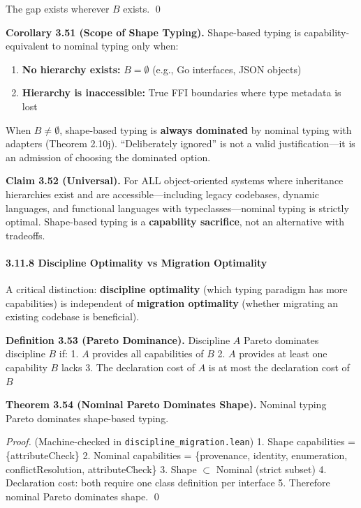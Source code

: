 The gap exists wherever \(B\) exists. \qed

\textbf{Corollary 3.51 (Scope of Shape Typing).} Shape-based typing is
capability-equivalent to nominal typing only when:

\begin{enumerate}
\def\labelenumi{\arabic{enumi}.}
\tightlist
\item
  \textbf{No hierarchy exists:} \(B = \emptyset\) (e.g., Go interfaces,
  JSON objects)
\item
  \textbf{Hierarchy is inaccessible:} True FFI boundaries where type
  metadata is lost
\end{enumerate}

When \(B \neq \emptyset\), shape-based typing is \textbf{always
dominated} by nominal typing with adapters (Theorem 2.10j).
``Deliberately ignored'' is not a valid justification---it is an
admission of choosing the dominated option.

\textbf{Claim 3.52 (Universal).} For ALL object-oriented systems where
inheritance hierarchies exist and are accessible---including legacy
codebases, dynamic languages, and functional languages with
typeclasses---nominal typing is strictly optimal. Shape-based typing is
a \textbf{capability sacrifice}, not an alternative with tradeoffs.

\paragraph{3.11.8 Discipline Optimality vs Migration
Optimality}\label{discipline-optimality-vs-migration-optimality}

A critical distinction:
\textbf{discipline optimality} (which typing paradigm has more
capabilities) is independent of \textbf{migration optimality} (whether
migrating an existing codebase is beneficial).

\textbf{Definition 3.53 (Pareto Dominance).} Discipline \(A\) Pareto
dominates discipline \(B\) if: 1. \(A\) provides all capabilities of
\(B\) 2. \(A\) provides at least one capability \(B\) lacks 3. The
declaration cost of \(A\) is at most the declaration cost of \(B\)

\textbf{Theorem 3.54 (Nominal Pareto Dominates Shape).} Nominal typing
Pareto dominates shape-based typing.

\emph{Proof.} (Machine-checked in \texttt{discipline\_migration.lean})
1. Shape capabilities = \{attributeCheck\} 2. Nominal capabilities =
\{provenance, identity, enumeration, conflictResolution,
attributeCheck\} 3. Shape $\subset$ Nominal (strict subset) 4. Declaration cost:
both require one class definition per interface 5. Therefore nominal
Pareto dominates shape. \qed

